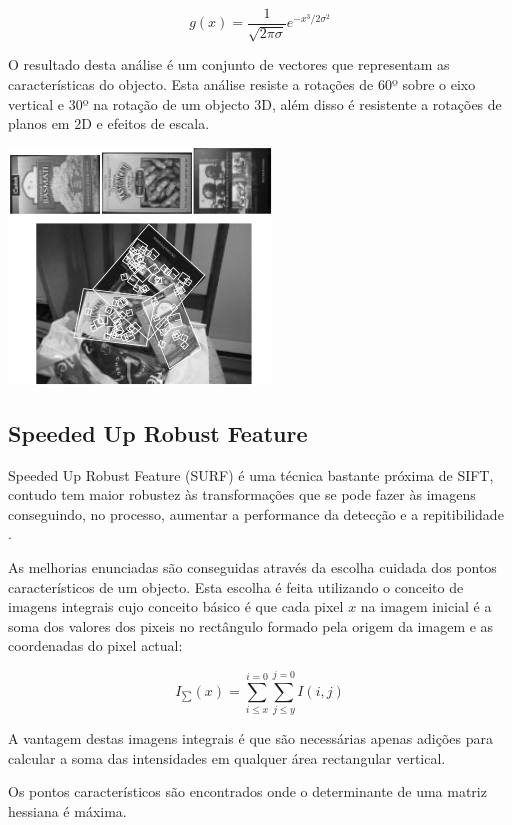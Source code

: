 \[
g(x) = \frac{1}{\sqrt{2\pi\sigma}}e^{-x^3 / 2 \sigma^2}
\]

O resultado desta análise é um conjunto de vectores que representam as
características do objecto. Esta análise resiste a rotações de 60º sobre
o eixo vertical e 30º na rotação de um objecto 3D, além disso é
resistente a rotações de planos em 2D e efeitos de escala.


\begin{center}
	\includegraphics[scale=1.00]{figures/sift_img.png}
	\label{fig:1}
\end{center}

\subsection[SURF]{Speeded Up Robust Feature}

Speeded Up Robust Feature (SURF) é uma técnica bastante próxima
de SIFT, contudo tem maior robustez às transformações que se pode
fazer às imagens conseguindo, no processo, aumentar a performance
da detecção e a repitibilidade \cite{citeulike:973069}.

As melhorias enunciadas são conseguidas através da escolha cuidada
dos pontos característicos de um objecto. Esta escolha é feita
utilizando o conceito de imagens integrais \cite{10.1109CVPR.2001.990517}
cujo conceito básico é que cada pixel $x$ na imagem inicial é a
soma dos valores dos pixeis no rectângulo formado pela origem da
imagem e as coordenadas do pixel actual:

\[
I_\sum(x) = \sum_{i \leq x}^{i=0} \sum_{j \leq y}^{j=0} I(i,j)
\]


A vantagem destas imagens integrais é que são necessárias apenas adições
para calcular a soma das intensidades em qualquer área rectangular vertical.

Os pontos característicos são encontrados onde o determinante de uma matriz
hessiana é máxima.



